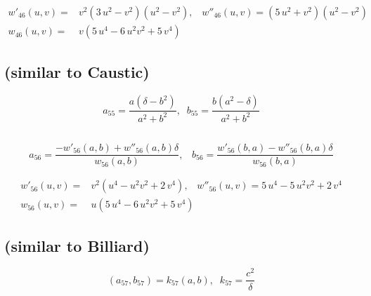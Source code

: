 \begin{align*}
w'_{46}(u,v)=& v^2(3\,{u}^{2}-{v}^{2} )(u^2-v^2),\;\;\;w''_{46}(u,v)= (5\,{u}^{2}+{v}^{2})(u^2-v^2) \\
w_{46}(u,v)=& v(5\,{u}^{4}-6\,{u}^{2}{v}^{2}+5\,{v}^{4} )
\end{align*}

\subsection{ (similar to Caustic)}
      
\begin{equation*}
a_{55}= {\frac{a\left(\delta-{b}^{2}
      		\right)}{{a}^{2}+{b}^{2}}},\;\;
       b_{55} =  { \frac{b \left( {a}^{2}-\delta
       	\right)}{{a}^{2}+{b}^{2}}}    
\end{equation*}    

\subsection{}
     
\begin{equation*}
a_{56}=  \frac{-w'_{56}(a,b) + w''_{56}(a,b) \delta}{  w_{56}(a,b) },\;\;\;   
b_{56}= \frac{ w'_{56}(b,a) - w''_{56}(b,a) \delta}{  w_{56}(b,a) } 
\end{equation*}

\begin{align*}
w'_{56}(u,v)=&v^2( {u}^{4}-{u}^{2}{v}^{2}+2\,{v}^{4}),\;\;\;w''_{56}(u,v)= 5\,{u}^{4}-5\,{u}^{2}{v}^{2}+2\,{v}^{4}  \\
w_{56}(u,v)=&u(5\,{u}^{4}-6\,{u}^{2}{v}^{2}+5\,{v}^{4} ) 
\end{align*}

\subsection{ (similar to Billiard)}
\begin{equation*}
\left(a_{57},b_{57}\right)=k_{57}\left(a,b\right),\;\;   k_{57}=\frac{c^2}{\delta}
\end{equation*}


